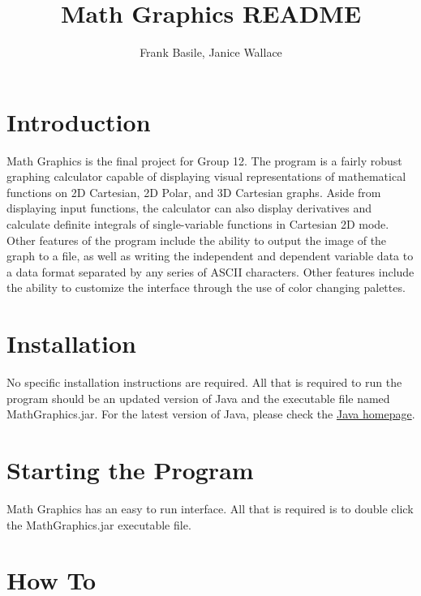 \documentclass{article}[12 pt]
\begin{document}
\title{Math Graphics README}
\author{Frank Basile, Janice Wallace}
\maketitle

\tableofcontents
	\section{Introduction}
		Math Graphics is the final project for Group 12. The program is a fairly robust graphing calculator capable of displaying visual representations of mathematical functions on 2D Cartesian, 2D Polar, and 3D Cartesian graphs. Aside from displaying input functions, the calculator can also display derivatives and calculate definite integrals of single-variable functions in Cartesian 2D mode. Other features of the program include the ability to output the image of the graph to a file, as well as writing the independent and dependent variable data to a data format separated by any series of ASCII characters. Other features include the ability to customize the interface through the use of color changing palettes.

	\section{Installation}
	    No specific installation instructions are required. All that is required to run the program should be an updated version of Java and the executable file named MathGraphics.jar. For the latest version of Java, please check the \href{http://www.java.com}{Java homepage}.
	    
	\section{Starting the Program}
		Math Graphics has an easy to run interface. All that is required is to double click the MathGraphics.jar executable file. 
		
	\section{How To}
\end{document}
